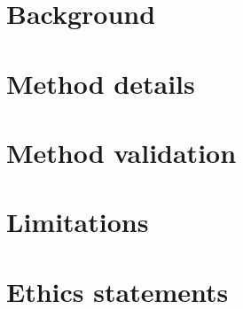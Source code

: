 \documentclass[review,3p,times]{elsarticle}
\begin{document}




\section{Background}


\section{Method details}


\section{Method validation}


\section{Limitations}


\section{Ethics statements}

\end{document}
